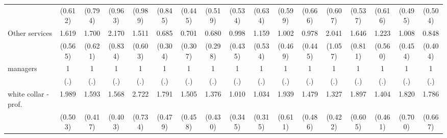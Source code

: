 {\begin{tabular}{l*{16}{c}}
                    &     (0.612)         &     (0.794)         &     (0.963)         &     (0.989)         &     (0.845)         &     (0.445)         &     (0.519)         &     (0.534)         &     (0.634)         &     (0.599)         &     (0.666)         &     (0.607)         &     (0.537)         &     (0.616)         &     (0.495)         &     (0.504)         \\
[1em]
Other services      &       1.619         &       1.700         &       2.170\sym{*}  &       1.511         &       0.685         &       0.701         &       0.680         &       0.998         &       1.159         &       1.002         &       0.978         &       2.041         &       1.646         &       1.223         &       1.008         &       0.848         \\
                    &     (0.565)         &     (0.621)         &     (0.834)         &     (0.603)         &     (0.304)         &     (0.307)         &     (0.298)         &     (0.435)         &     (0.534)         &     (0.469)         &     (0.445)         &     (1.057)         &     (0.811)         &     (0.560)         &     (0.454)         &     (0.404)         \\
[1em]
managers            &           1         &           1         &           1         &           1         &           1         &           1         &           1         &           1         &           1         &           1         &           1         &           1         &           1         &           1         &           1         &           1         \\
                    &         (.)         &         (.)         &         (.)         &         (.)         &         (.)         &         (.)         &         (.)         &         (.)         &         (.)         &         (.)         &         (.)         &         (.)         &         (.)         &         (.)         &         (.)         &         (.)         \\
[1em]
white collar - prof.&       1.989\sym{**} &       1.593         &       1.568         &       2.722\sym{***}&       1.791\sym{*}  &       1.505         &       1.376         &       1.010         &       1.034         &       1.939\sym{*}  &       1.479         &       1.327         &       1.897\sym{*}  &       1.404         &       1.820         &       1.786         \\
                    &     (0.503)         &     (0.417)         &     (0.403)         &     (0.734)         &     (0.479)         &     (0.458)         &     (0.430)         &     (0.345)         &     (0.315)         &     (0.611)         &     (0.486)         &     (0.422)         &     (0.605)         &     (0.461)         &     (0.700)         &     (0.667)         \\

\end{tabular}}
